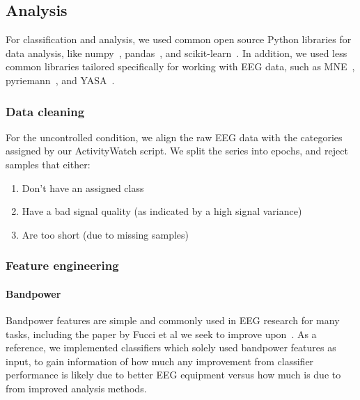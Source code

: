 \subsection{Analysis}

    For classification and analysis, we used common open source Python libraries for data analysis, like numpy~\cite{harris2020array}, pandas~\cite{reback2020pandas}, and scikit-learn~\cite{scikit-learn}. In addition, we used less common libraries tailored specifically for working with EEG data, such as MNE~\cite{noauthor_mne-toolsmne-python_2020}, pyriemann~\cite{alexandre_barachant_2020_3715511}, and YASA~\cite{raphael_vallat_raphaelvallatyasa_2020}.

    \subsubsection{Data cleaning}

        For the uncontrolled condition, we align the raw EEG data with the categories assigned by our ActivityWatch script. We split the series into epochs, and reject samples that either:

        \begin{enumerate}
            \item Don't have an assigned class
            \item Have a bad signal quality (as indicated by a high signal variance)
            \item Are too short (due to missing samples)
        \end{enumerate}


    \subsubsection{Feature engineering}

        \paragraph{Bandpower}

            Bandpower features are simple and commonly used in EEG research for many tasks, including the paper by Fucci et al we seek to improve upon~\cite{fucci_replication_2019}. As a reference, we implemented classifiers which solely used bandpower features as input, to gain information of how much any improvement from classifier performance is likely due to better EEG equipment versus how much is due to from improved analysis methods.

